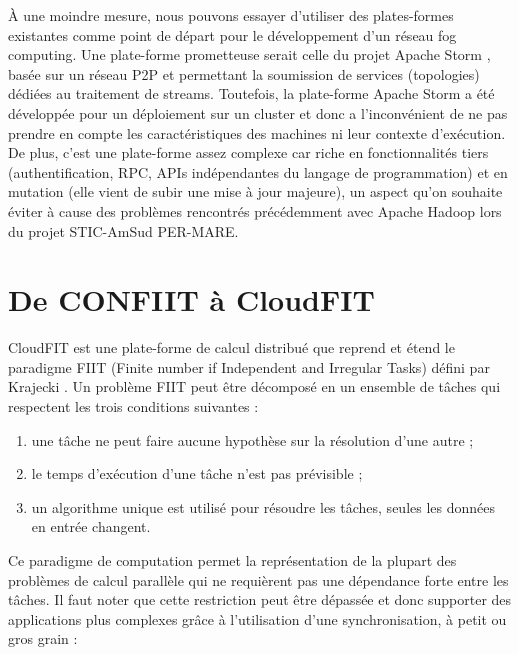 À une moindre mesure, nous pouvons essayer d'utiliser des plates-formes existantes comme point de départ pour le développement d'un réseau fog computing. Une plate-forme prometteuse serait celle du projet Apache Storm\cite{ApacheStorm} , basée sur un réseau P2P et permettant la soumission de services (topologies) dédiées au traitement de streams. Toutefois, la plate-forme Apache Storm a été développée pour un déploiement sur un cluster et donc a l'inconvénient de ne pas prendre en compte les caractéristiques des machines ni leur contexte d'exécution. De plus, c'est une plate-forme assez complexe car riche en fonctionnalités tiers (authentification, RPC, APIs indépendantes du langage de programmation) et en mutation (elle vient de subir une mise à jour majeure), un aspect qu'on souhaite éviter à cause des problèmes rencontrés précédemment avec Apache Hadoop lors du projet STIC-AmSud PER-MARE. 


\section{De CONFIIT à CloudFIT}

CloudFIT est une plate-forme de calcul distribué que reprend et étend le paradigme FIIT (Finite number if Independent and Irregular Tasks) défini par Krajecki \cite{Kraj99}. Un problème FIIT peut être décomposé en un ensemble de tâches qui respectent les trois conditions suivantes :
\begin{enumerate}
	\item une tâche ne peut faire aucune hypothèse sur la résolution d’une autre ;
	\item le temps d’exécution d’une tâche n’est pas prévisible ;
	\item un algorithme unique est utilisé pour résoudre les tâches, seules les données en entrée changent. 
\end{enumerate}

Ce paradigme de computation permet la représentation de la plupart des problèmes de calcul parallèle qui ne requièrent pas une dépendance forte entre les tâches. Il faut noter que cette restriction peut être dépassée et donc supporter des applications plus complexes grâce à l'utilisation d'une synchronisation, à petit ou gros grain :

